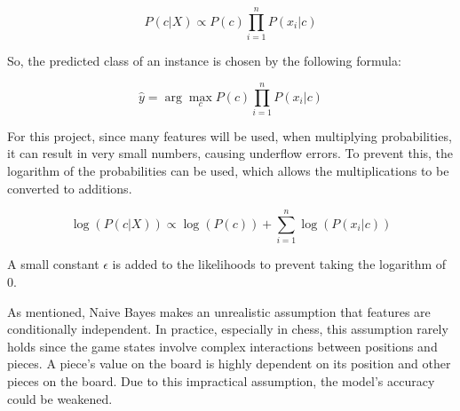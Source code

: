 \begin{equation}
    \label{eq:posterior}
    P(c | X) \propto P(c) \prod_{i=1}^{n} P(x_i | c)
\end{equation}

So, the predicted class of an instance is chosen by the following formula:

\begin{equation}
    \label{eq:prediction}
    \hat{y} = \arg\max_{c} P(c) \prod_{i=1}^{n} P(x_i | c)
\end{equation}

For this project, since many features will be used, when multiplying probabilities, it can result in very small numbers, causing underflow errors. To prevent this, the logarithm of the probabilities can be used, which allows the multiplications to be converted to additions.

\begin{equation}
    \label{eq:log}
    \log(P(c | X)) \propto \log(P(c)) + \sum_{i=1}^{n} \log(P(x_i | c))
\end{equation}

A small constant $\epsilon$ is added to the likelihoods to prevent taking the logarithm of 0.

As mentioned, Naive Bayes makes an unrealistic assumption that features are conditionally independent. In practice, especially in chess, this assumption rarely holds since the game states involve complex interactions between positions and pieces. A piece's value on the board is highly dependent on its position and other pieces on the board. Due to this impractical assumption, the model's accuracy could be 
weakened. 






